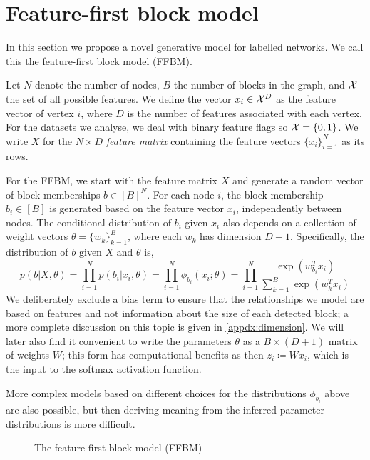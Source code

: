 \section{Feature-first block model}

In this section we propose a novel generative model for labelled networks. We call this the feature-first block model (FFBM).

Let $N$ denote the number of nodes, $B$ the number of blocks in the graph,
and ${\cal X}$ the set of all possible features.
We define the vector $x_i \in \mathcal{X}^D$ as the feature vector of vertex $i$, 
where $D$ is the number of features associated with each vertex.
For the datasets we analyse, we deal with binary feature flags so $\mathcal{X} = \{0, 1\}$. We write $X$ for the $N\times D$ {\em feature matrix} containing
the feature vectors $\{x_i\}_{i=1}^{N}$ 
as its rows.

For the FFBM, we start with the feature matrix $X$ and generate a random
vector of block memberships $b \in [B]^N$. For each node $i$, the
block membership $b_i\in[B]$ is generated based on the feature
vector $x_i$, independently between nodes. The conditional
distribution of $b_i$ given $x_i$ also depends on a collection
of weight vectors $\theta=\{w_k\}_{k=1}^B$, where each
$w_k$ has dimension $D+1$. Specifically, 
the distribution of $b$ given $X$ and $\theta$ is,
%
\begin{equation}
	p(b| X, \theta) = \prod_{i=1}^{N} p(b_i | x_i, \theta) = \prod_{i=1}^{N} \phi_{b_i} (x_i; \theta)
	= \prod_{i=1}^{N} \frac{\exp\left(w_{b_i}^T x_i\right)}{\sum_{k=1}^{B} \exp \left( w_k^T x_i\right)}
\end{equation}
%
We deliberately exclude a bias term to ensure that the relationships we model are based on features and not information about the size of each detected block;
a more complete discussion on this topic is given in \ref{appdx:dimension}. 
We will later also find it convenient
to write the parameters $\theta$ as a $B \times (D+1)$ matrix of weights $W$; this form has computational benefits as then $z_i \coloneqq W x_i$, which is the input to the softmax activation function.

More complex models based on different choices for the distributions
$\phi_{b_i}$ above are also possible, but then deriving meaning from 
the inferred parameter distributions is more difficult. 

\begin{figure}[!h]
	\centering
	\caption{The feature-first block model (FFBM)}
	\label{fig:ffbm}
\end{figure}


